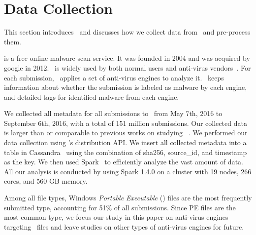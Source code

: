 \vspace{-0.05in}
\section{Data Collection}
\label{sec:meth}

This section introduces \vt\ and 
discusses how we collect data from \vt\ and pre-process them.

\noindent{\underline{\textit{\vt}}}
is a free online malware scan service.
It was founded in 2004 and was acquired by google in 2012. 
\vt\ is widely used by both normal users and anti-virus vendors~\cite{huangvt2016bigdata, neeles}. 
For each submission, \vt\ applies a set of anti-virus engines to analyze it. 
\vt\ keeps information about whether the submission is labeled as malware by each engine, 
and detailed tags for identified malware from each engine. 


We collected all metadata for all submissions to \vt\ from May 7th, 2016 to September 6th, 2016,
with a total of 151 million submissions. 
Our collected data is larger than or comparable to previous works on studying \vt~\cite{SongAPsys2016,huangvt2016bigdata}.
We performed our data collection using \vt{}'s distribution API.
We insert all collected metadata into a table in Cassandra~\cite{cassandra} 
using the combination of sha256, source\_id, and timestamp as the key.
We then used Spark~\cite{spark} to efficiently analyze the vast amount of data.
All our analysis is conducted by using Spark 1.4.0 on a cluster with 19 nodes, 266 cores, and 560 GB memory. 

Among all file types, Windows \textit{Portable Executable} ({\em \pe}) files 
are the most frequently submitted type,
accounting for 51\% of all submissions.
Since PE files are the most common type,
we focus our study in this paper on anti-virus engines targeting \pe\ files 
and leave studies on other types of anti-virus engines for future. 

